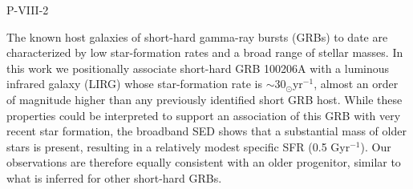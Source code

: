 P-VIII-2


\bigskip



\bigskip

\noindent The known host galaxies of short-hard gamma-ray bursts (GRBs) to date are characterized by low star-formation rates and a broad range of stellar masses.  In this work we positionally associate short-hard GRB 100206A with a luminous infrared galaxy (LIRG) whose star-formation rate is $\sim30 _{\odot} $yr$^{-1}$, almost an order of magnitude higher than any previously identified short GRB host.  While these properties could be interpreted to support an association of this GRB with very recent star formation, the broadband SED shows that a substantial mass of older stars is present, resulting in a relatively modest specific SFR (0.5 Gyr$^{-1}$). Our observations are therefore equally consistent with an older progenitor, similar to what is  inferred for other short-hard GRBs.

